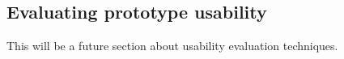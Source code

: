 \subsection{Evaluating prototype usability}
This will be a future section about usability evaluation techniques.
    